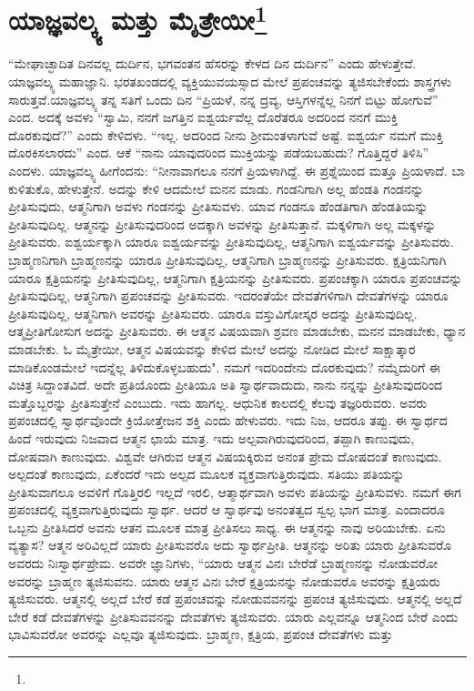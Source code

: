 
\chapter[ಯಾಜ್ಞವಲ್ಕ್ಯ ಮತ್ತು ಮೈತ್ರೇಯೀ]{ಯಾಜ್ಞವಲ್ಕ್ಯ ಮತ್ತು ಮೈತ್ರೇಯೀ\protect\footnote{}}

“ಮೇಘಾಚ್ಛಾದಿತ ದಿನವಲ್ಲ ದುರ್ದಿನ, ಭಗವಂತನ ಹೆಸರನ್ನು ಕೇಳದ ದಿನ ದುರ್ದಿನ'' ಎಂದು ಹೇಳುತ್ತೇವೆ. ಯಾಜ್ಞವಲ್ಕ್ಯ ಮಹಾಜ್ಞಾನಿ. ಭರತಖಂಡದಲ್ಲಿ ವ್ಯಕ್ತಿಯು\break ವಯಸ್ಸಾದ ಮೇಲೆ ಪ್ರಪಂಚವನ್ನು ತ್ಯಜಿಸಬೇಕೆಂದು ಶಾಸ್ತ್ರಗಳು ಸಾರುತ್ತವೆ.\break ಯಾಜ್ಞವಲ್ಕ್ಯ ತನ್ನ ಸತಿಗೆ ಒಂದು ದಿನ “ಪ್ರಿಯಳೆ, ನನ್ನ ದ್ರವ್ಯ, ಆಸ್ತಿಗಳನ್ನೆಲ್ಲ ನಿನಗೆ ಬಿಟ್ಟು ಹೋಗುವೆ'' ಎಂದ. ಅದಕ್ಕೆ ಅವಳು “ಸ್ವಾಮಿ, ನನಗೆ ಜಗತ್ತಿನ ಐಶ್ವರ್ಯವೆಲ್ಲ ದೊರೆತರೂ ಅದರಿಂದ ನನಗೆ ಮುಕ್ತಿ ದೊರಕುವುದೆ?'' ಎಂದು ಕೇಳಿದಳು. “ಇಲ್ಲ. ಅದರಿಂದ ನೀನು ಶ‍್ರೀಮಂತಳಾಗುವೆ ಅಷ್ಟೆ. ಐಶ್ವರ್ಯ ನಮಗೆ ಮುಕ್ತಿ ದೊರಕಿಸಲಾರದು'' ಎಂದ. ಆಕೆ “ನಾನು ಯಾವುದರಿಂದ ಮುಕ್ತಿಯನ್ನು ಪಡೆಯಬಹುದು? ಗೊತ್ತಿದ್ದರೆ ತಿಳಿಸಿ” ಎಂದಳು. ಯಾಜ್ಞವಲ್ಕ್ಯ ಹೀಗೆಂದನು: “ನೀನಾವಾಗಲೂ ನನಗೆ ಪ್ರಿಯಳಾಗಿದ್ದೆ. ಈ ಪ್ರಶ್ನೆಯಿಂದ ಮತ್ತೂ ಪ್ರಿಯಳಾದೆ. ಬಾ ಕುಳಿತುಕೊ, ಹೇಳುತ್ತೇನೆ. ಅದನ್ನು ಕೇಳಿ ಆದಮೇಲೆ ಮನನ ಮಾಡು. ಗಂಡನಿಗಾಗಿ ಅಲ್ಲ ಹೆಂಡತಿ ಗಂಡನನ್ನು ಪ್ರೀತಿಸುವುದು, ಆತ್ಮನಿಗಾಗಿ ಅವಳು ಗಂಡನನ್ನು ಪ್ರೀತಿಸುವಳು. ಯಾವ ಗಂಡನೂ ಹೆಂಡತಿಗಾಗಿ ಹೆಂಡತಿಯನ್ನು ಪ್ರೀತಿಸುವುದಿಲ್ಲ. ಆತ್ಮನನ್ನು ಪ್ರೀತಿಸುವುದರಿಂದ ಅದಕ್ಕಾಗಿ ಅವಳನ್ನು ಪ್ರೀತಿಸುತ್ತಾನೆ. ಮಕ್ಕಳಿಗಾಗಿ ಅಲ್ಲ ಮಕ್ಕಳನ್ನು ಪ್ರೀತಿಸುವರು. ಐಶ್ವರ್ಯಕ್ಕಾಗಿ ಯಾರೂ ಐಶ್ವರ್ಯವನ್ನು ಪ್ರೀತಿಸುವುದಿಲ್ಲ, ಆತ್ಮನಿಗಾಗಿ ಐಶ್ವರ್ಯವನ್ನು ಪ್ರೀತಿಸುವರು. ಬ್ರಾಹ್ಮಣನಿಗಾಗಿ ಬ್ರಾಹ್ಮಣನನ್ನು ಯಾರೂ ಪ್ರೀತಿಸುವುದಿಲ್ಲ, ಆತ್ಮನಿಗಾಗಿ ಬ್ರಾಹ್ಮಣನನ್ನು ಪ್ರೀತಿಸುವರು. ಕ್ಷತ್ರಿಯನಿಗಾಗಿ ಯಾರೂ ಕ್ಷತ್ರಿಯನನ್ನು ಪ್ರೀತಿಸುವುದಿಲ್ಲ, ಆತ್ಮನಿಗಾಗಿ ಕ್ಷತ್ರಿಯನನ್ನು ಪ್ರೀತಿಸುವರು. ಪ್ರಪಂಚಕ್ಕಾಗಿ ಯಾರೂ ಪ್ರಪಂಚವನ್ನು ಪ್ರೀತಿಸುವುದಿಲ್ಲ, ಆತ್ಮನಿಗಾಗಿ ಪ್ರಪಂಚವನ್ನು ಪ್ರೀತಿಸುವರು. ಇದರಂತೆಯೇ ದೇವತೆಗಳಿಗಾಗಿ ದೇವತೆಗಳನ್ನು ಯಾರೂ ಪ್ರೀತಿಸುವುದಿಲ್ಲ, ಆತ್ಮನಿಗಾಗಿ ಅವರನ್ನು ಪ್ರೀತಿಸುವರು. ಯಾರೂ ವಸ್ತುವಿಗೋಸ್ಕರ ಅದನ್ನು ಪ್ರೀತಿಸುವುದಿಲ್ಲ. ಆತ್ಮಪ್ರೀತಿಗೋಸುಗ ಅದನ್ನು ಪ್ರೀತಿಸುವರು. ಈ ಆತ್ಮನ ವಿಷಯವಾಗಿ ಶ್ರವಣ ಮಾಡಬೇಕು, ಮನನ ಮಾಡಬೇಕು, ಧ್ಯಾನ ಮಾಡಬೇಕು. ಓ ಮೈತ್ರೇಯೀ, ಆತ್ಮನ ವಿಷಯವನ್ನು ಕೇಳಿದ ಮೇಲೆ ಅದನ್ನು ನೋಡಿದ ಮೇಲೆ ಸಾಕ್ಷಾತ್ಕಾರ ಮಾಡಿಕೊಂಡಮೇಲೆ ಇದನ್ನೆಲ್ಲ ತಿಳಿದುಕೊಳ್ಳಬಹುದು". ನಮಗೆ ಇದರಿಂದೇನು ದೊರಕುವುದು? ನಮ್ಮೆದುರಿಗೆ ಈ ವಿಚಿತ್ರ ಸಿದ್ದಾಂತವಿದೆ. ಅದೇ ಪ್ರತಿಯೊಂದು ಪ್ರೀತಿಯೂ ಅತಿ ಸ್ವಾರ್ಥವಾದುದು, ನಾನು ನನ್ನನ್ನು ಪ್ರೀತಿಸುವುದರಿಂದ ಮತ್ತೊಬ್ಬರನ್ನು ಪ್ರೀತಿಸುತ್ತೇನೆ ಎಂಬುದು. ಇದು ಹಾಗಲ್ಲ. ಆಧುನಿಕ ಕಾಲದಲ್ಲಿ ಕೆಲವು ತಜ್ಞರಿರುವರು. ಅವರು ಪ್ರಪಂಚದಲ್ಲಿ ಸ್ವಾರ್ಥವೊಂದೇ ಕ್ರಿಯೋತ್ತೇಜನ ಶಕ್ತಿ ಎಂದು ಹೇಳುವರು. ಇದು ನಿಜ, ಆದರೂ ತಪ್ಪು. ಈ ಸ್ವಾರ್ಥದ ಹಿಂದೆ ಇರುವುದು ನಿಜವಾದ ಆತ್ಮನ ಛಾಯೆ ಮಾತ್ರ. ಇದು ಅಲ್ಪವಾಗಿರುವುದರಿಂದ, ತಪ್ಪಾಗಿ ಕಾಣುವುದು, ದೋಷವಾಗಿ ಕಾಣುವುದು. ವಿಶ್ವವೇ ಆಗಿರುವ ಆತ್ಮನ ವಿಷಯಕ್ಕಿರುವ ಅನಂತ ಪ್ರೇಮ ದೋಷದಂತೆ ಕಾಣುವುದು. ಅಲ್ಪದಂತೆ ಕಾಣುವುದು, ಏಕೆಂದರೆ ಇದು ಅಲ್ಪದ ಮೂಲಕ ವ್ಯಕ್ತವಾಗುತ್ತಿರುವುದು. ಸತಿಯು ಪತಿಯನ್ನು ಪ್ರೀತಿಸುವಾಗಲೂ ಅವಳಿಗೆ ಗೊತ್ತಿರಲಿ ಇಲ್ಲದೆ ಇರಲಿ, ಆತ್ಮಾರ್ಥವಾಗಿ ಅವಳು ಪತಿಯನ್ನು ಪ್ರೀತಿಸುವಳು. ನಮಗೆ ಈಗ ಪ್ರಪಂಚದಲ್ಲಿ ವ್ಯಕ್ತವಾಗುತ್ತಿರುವುದು ಸ್ವಾರ್ಥ. ಆದರೆ ಆ ಸ್ವಾರ್ಥವು ಅನಂತತ್ವದ ಸ್ವಲ್ಪ ಭಾಗ ಮಾತ್ರ. ಎಂದಾದರೂ ಒಬ್ಬನು ಪ್ರೀತಿಸಿದರೆ ಅವನು ಆತನ ಮೂಲಕ ಮಾತ್ರ ಪ್ರೀತಿಸಲು ಸಾಧ್ಯ. ಈ ಆತ್ಮನನ್ನು ನಾವು ಅರಿಯಬೇಕು. ಏನು ವ್ಯತ್ಯಾಸ? ಆತ್ಮನ ಅರಿವಿಲ್ಲದೆ ಯಾರು ಪ್ರೀತಿಸುವರೊ ಅದು ಸ್ವಾರ್ಥಪ್ರೀತಿ. ಆತ್ಮನನ್ನು ಅರಿತು ಯಾರು ಪ್ರೀತಿಸುವರೊ ಅವರದು ನಿಃಸ್ವಾರ್ಥಪ್ರೇಮ. ಅವರೇ ಜ್ಞಾನಿಗಳು, “ಯಾರು ಆತ್ಮನ ವಿನಃ ಬೇರೆಡೆ ಬ್ರಾಹ್ಮಣನನ್ನು ನೋಡುವರೋ ಅವರನ್ನು ಬ್ರಾಹ್ಮಣ ತ್ಯಜಿಸುವನು. ಯಾರು ಆತ್ಮನ ವಿನಃ ಬೇರೆ ಕ್ಷತ್ರಿಯನನ್ನು ನೋಡುವರೊ ಅವರನ್ನು ಕ್ಷತ್ರಿಯರು ತ್ಯಜಿಸುವರು. ಆತ್ಮನಲ್ಲಿ ಅಲ್ಲದೆ ಬೇರೆ ಕಡೆ ಪ್ರಪಂಚವನ್ನು ನೋಡುವವನನ್ನು ಪ್ರಪಂಚ ತ್ಯಜಿಸುವುದು. ಆತ್ಮನಲ್ಲಿ ಅಲ್ಲದೆ ಬೇರೆ ಕಡೆ ದೇವತೆಗಳನ್ನು ಪ್ರೀತಿಸುವವನನ್ನು ದೇವತೆಗಳು ತ್ಯಜಿಸುವರು. ಯಾರು ಎಲ್ಲವನ್ನೂ ಆತ್ಮನಿಂದ ಬೇರೆ ಎಂದು ಭಾವಿಸುವರೋ ಅವರನ್ನು ಎಲ್ಲವೂ ತ್ಯಜಿಸುವುದು. ಬ್ರಾಹ್ಮಣ, ಕ್ಷತ್ರಿಯ, ಪ್ರಪಂಚ ದೇವತೆಗಳು ಮತ್ತು 